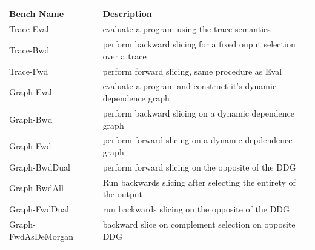 \begin{table}
\label{benchmark-descriptions}
\begin{tabular}{ll}
   \toprule
Bench Name & Description \\
\midrule
Trace-Eval & evaluate a program using the trace semantics \\
Trace-Bwd & perform backward slicing for a fixed ouput selection over a trace \\
Trace-Fwd & perform forward slicing, same procedure as Eval \\
Graph-Eval & evaluate a program and construct it's dynamic dependence graph \\
Graph-Bwd & perform backward slicing on a dynamic dependence graph \\ 
Graph-Fwd & perform forward slicing on a dynamic depdendence graph \\
Graph-BwdDual  & perform forward slicing on the opposite of the DDG \\
Graph-BwdAll & Run backwards slicing after selecting the entirety of the output \\
Graph-FwdDual & run backwards slicing on the opposite of the DDG \\
Graph-FwdAsDeMorgan & backward slice on complement selection on opposite DDG \\
\bottomrule
\end{tabular}
\end{table}